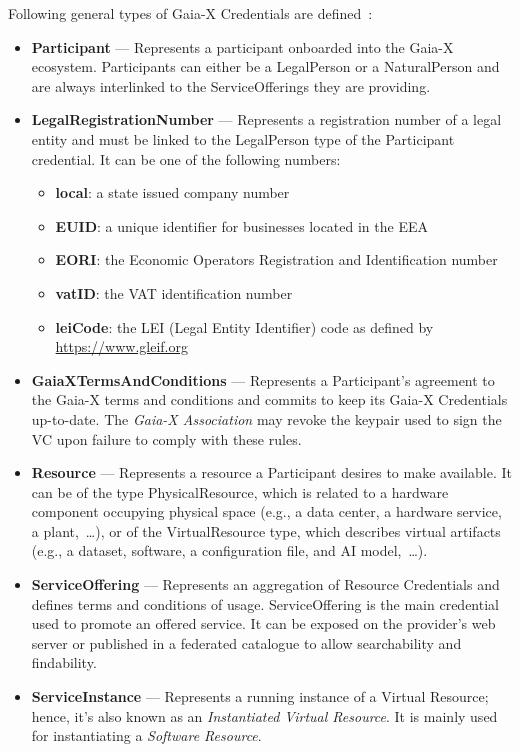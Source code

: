 Following general types of Gaia-X Credentials are defined~\cite{gaiax_architecture_document,gaiax_trust_framework}:
\begin{itemize}
    \item \textbf{Participant} --- Represents a participant onboarded into the Gaia-X ecosystem.
    Participants can either be a LegalPerson or a NaturalPerson and are always interlinked to the ServiceOfferings they are providing.
    \item \textbf{LegalRegistrationNumber} --- Represents a registration number of a legal entity and must be linked to the LegalPerson type of the Participant credential.
    It can be one of the following numbers:
    \begin{itemize}
        \item \textbf{local}: a state issued company number
        \item \textbf{EUID}: a unique identifier for businesses located in the EEA
        \item \textbf{EORI}: the Economic Operators Registration and Identification number
        \item \textbf{vatID}: the VAT identification number
        \item \textbf{leiCode}: the LEI (Legal Entity Identifier) code as defined by \url{https://www.gleif.org}
    \end{itemize}
    \item \textbf{GaiaXTermsAndConditions} --- Represents a Participant's agreement to the Gaia-X terms and conditions and commits to keep its Gaia-X Credentials up-to-date.
    The \textit{Gaia-X Association} may revoke the keypair used to sign the VC upon failure to comply with these rules.
    \item \textbf{Resource} --- Represents a resource a Participant desires to make available.
    It can be of the type PhysicalResource, which is related to a hardware component occupying physical space (e.g., a data center, a hardware service, a plant,~\ldots), or of the VirtualResource type, which describes virtual artifacts (e.g., a dataset, software, a configuration file, and AI model,~\ldots).
    \item \textbf{ServiceOffering} --- Represents an aggregation of Resource Credentials and defines terms and conditions of usage.
    ServiceOffering is the main credential used to promote an offered service.
    It can be exposed on the provider's web server or published in a federated catalogue to allow searchability and findability.
    \item \textbf{ServiceInstance} --- Represents a running instance of a Virtual Resource; hence, it's also known as an \textit{Instantiated Virtual Resource}.
    It is mainly used for instantiating a \textit{Software Resource}.
\end{itemize}

